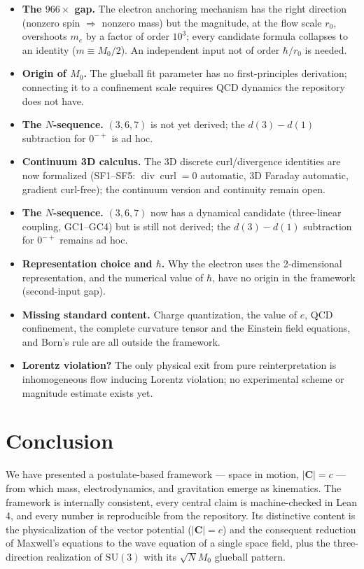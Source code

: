 \documentclass[aps,prd,preprint,superscriptaddress,amsmath,amssymb]{revtex4-2}
\begin{document}
\begin{itemize}
  \item \textbf{The $966\times$ gap.}  The electron anchoring mechanism has
  the right direction (nonzero spin $\Rightarrow$ nonzero mass) but the
  magnitude, at the flow scale $r_0$, overshoots $m_e$ by a factor of
  order $10^3$; every candidate formula collapses to an identity
  ($m\equiv M_0/2$).  An independent input not of order $\hbar/r_0$ is
  needed.
  \item \textbf{Origin of $M_0$.}  The glueball fit parameter has no
  first-principles derivation; connecting it to a confinement scale requires
  QCD dynamics the repository does not have.
  \item \textbf{The $N$-sequence.}  $(3,6,7)$ is not yet derived; the
  $d(3)-d(1)$ subtraction for $0^{-+}$ is ad hoc.
  \item \textbf{Continuum 3D calculus.}  The 3D discrete curl/divergence
  identities are now formalized (SF1--SF5: $\operatorname{div}\!\operatorname{curl}=0$
  automatic, 3D Faraday automatic, gradient curl-free); the continuum
  version and continuity remain open.
  \item \textbf{The $N$-sequence.}  $(3,6,7)$ now has a dynamical candidate
  (three-linear coupling, GC1--GC4) but is still not derived; the
  $d(3)-d(1)$ subtraction for $0^{-+}$ remains ad hoc.
  \item \textbf{Representation choice and $\hbar$.}  Why the electron uses the
  2-dimensional representation, and the numerical value of $\hbar$, have no
  origin in the framework (second-input gap).
  \item \textbf{Missing standard content.}  Charge quantization, the value
  of $e$, QCD confinement, the complete curvature tensor and the Einstein
  field equations, and Born's rule are all outside the framework.
  \item \textbf{Lorentz violation?}  The only physical exit from pure
  reinterpretation is inhomogeneous flow inducing Lorentz violation; no
  experimental scheme or magnitude estimate exists yet.
\end{itemize}

\section{Conclusion}\label{sec:conclusion}

We have presented a postulate-based framework --- space in motion,
$|\bm{C}|=c$ --- from which mass, electrodynamics, and gravitation emerge as
kinematics.  The framework is internally consistent, every central claim is
machine-checked in Lean 4, and every number is reproducible from the
repository.  Its distinctive content is the physicalization of the vector
potential ($|\bm{C}|=c$) and the consequent reduction of Maxwell's equations
to the wave equation of a single space field, plus the three-direction
realization of $\mathrm{SU}(3)$ with its $\sqrt{N}M_0$ glueball pattern.
\end{document}
